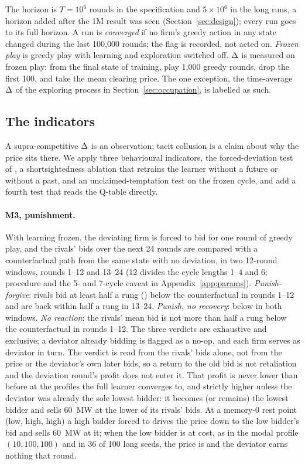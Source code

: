 The horizon is $T = 10^6$ rounds in the specification and $5 \times 10^6$ in the long runs, a horizon added after the 1M result was seen (Section~\ref{sec:design}); every run goes to its full horizon. A run is \emph{converged} if no firm's greedy action in any state changed during the last 100,000 rounds; the flag is recorded, not acted on. \emph{Frozen play} is greedy play with learning and exploration switched off. $\Delta$ is measured on frozen play: from the final state of training, play 1,000 greedy rounds, drop the first 100, and take the mean clearing price. The one exception, the time-average $\Delta$ of the exploring process in Section~\ref{sec:occupation}, is labelled as such.

\subsection{The indicators}\label{sec:indicators}

A supra-competitive $\Delta$ is an observation; tacit collusion is a claim about why the price sits there. We apply three behavioural indicators, the forced-deviation test of \citet{calvano2020}, a shortsightedness ablation that retrains the learner without a future or without a past, and an unclaimed-temptation test on the frozen cycle, and add a fourth test that reads the Q-table directly.

\paragraph{M3, punishment.} With learning frozen, the deviating firm is forced to bid  for one round of greedy play, and the rivals' bids over the next 24 rounds are compared with a counterfactual path from the same state with no deviation, in two 12-round windows, rounds 1--12 and 13--24 (12 divides the cycle lengths 1--4 and 6; procedure and the 5- and 7-cycle caveat in Appendix~\ref{app:params}). \emph{Punish-forgive}: rivals bid at least half a rung () below the counterfactual in rounds 1--12 and are back within half a rung in 13--24. \emph{Punish, no recovery}: below in both windows. \emph{No reaction}: the rivals' mean bid is not more than half a rung below the counterfactual in rounds 1--12. The three verdicts are exhaustive and exclusive; a deviator already bidding  is flagged as a no-op, and each firm serves as deviator in turn. The verdict is read from the rivals' bids alone, not from the price or the deviator's own later bids, so a return to the old bid is not retaliation and the deviation round's profit does not enter it. That profit is never lower than before at the profiles the full learner converges to, and strictly higher unless the deviator was already the sole lowest bidder: it becomes (or remains) the lowest bidder and sells 60~MW at the lower of its rivals' bids. At a memory-0 rest point (low, high, high) a high bidder forced to  drives the price down to the low bidder's bid and sells 60~MW at it; when the low bidder is at cost, as in the modal profile $(10, 100, 100)$ and in 36 of 100 long seeds, the price is  and the deviator earns nothing that round.

